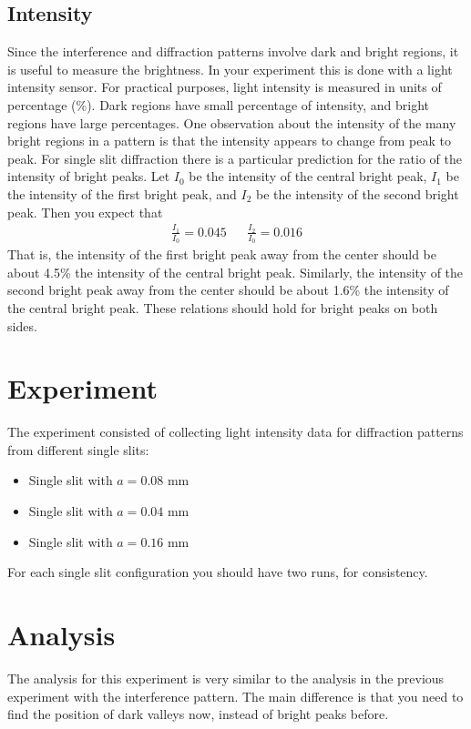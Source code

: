 \subsection{Intensity}
%
Since the interference and diffraction patterns involve dark and bright regions, it is useful to measure the brightness. In your experiment this is done with a light intensity sensor. For practical purposes, light intensity is measured in units of percentage (\%). Dark regions have small percentage of intensity, and bright regions have large percentages. One observation about the intensity of the many bright regions in a pattern is that the intensity appears to change from peak to peak. For single slit diffraction there is a particular prediction for the ratio of the intensity of bright peaks. Let $I_{0}$ be the intensity of the central bright peak, $I_{1}$ be the intensity of the first bright peak, and $I_{2}$ be the intensity of the second bright peak. Then you expect that
\begin{align}
    \frac{I_{1}}{I_{0}} = 0.045 && \frac{I_{2}}{I_{0}} = 0.016
\end{align}
That is, the intensity of the first bright peak away from the center should be about 4.5\% the intensity of the central bright peak. Similarly, the intensity of the second bright peak away from the center should be about 1.6\% the intensity of the central bright peak. These relations should hold for bright peaks on both sides.
%
\section{Experiment}
%
The experiment consisted of collecting light intensity data for diffraction patterns from different single slits:
\begin{itemize}
    \item Single slit with $a = 0.08$ mm
    \item Single slit with $a = 0.04$ mm
    \item Single slit with $a = 0.16$ mm
\end{itemize}
For each single slit configuration you should have two runs, for consistency.
%
\section{Analysis}
%
The analysis for this experiment is very similar to the analysis in the previous experiment with the interference pattern. The main difference is that you need to find the position of dark valleys now, instead of bright peaks before.
%
